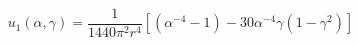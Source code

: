 \begin{equation}
u_1(\alpha, \gamma)=\frac1{1440\pi^2r^4}[(\alpha^{-4}-1)-30\alpha^{-4}
\gamma(1-\gamma^2)]
\label{51}
\end{equation}

